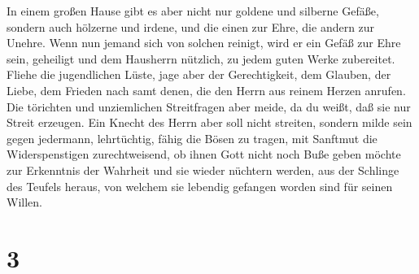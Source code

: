  In einem großen Hause gibt es aber nicht nur goldene und
silberne Gefäße, sondern auch hölzerne und irdene, und die einen zur
Ehre, die andern zur Unehre.  Wenn nun jemand sich von
solchen reinigt, wird er ein Gefäß zur Ehre sein, geheiligt und dem
Hausherrn nützlich, zu jedem guten Werke zubereitet. 
Fliehe die jugendlichen Lüste, jage aber der Gerechtigkeit, dem Glauben,
der Liebe, dem Frieden nach samt denen, die den Herrn aus reinem Herzen
anrufen.  Die törichten und unziemlichen Streitfragen
aber meide, da du weißt, daß sie nur Streit erzeugen. 
Ein Knecht des Herrn aber soll nicht streiten, sondern milde sein gegen
jedermann, lehrtüchtig, fähig die Bösen zu tragen,  mit
Sanftmut die Widerspenstigen zurechtweisend, ob ihnen Gott nicht noch
Buße geben möchte zur Erkenntnis der Wahrheit  und sie
wieder nüchtern werden, aus der Schlinge des Teufels heraus, von welchem
sie lebendig gefangen worden sind für seinen Willen.

\hypertarget{section-2}{%
\section{3}\label{section-2}}

